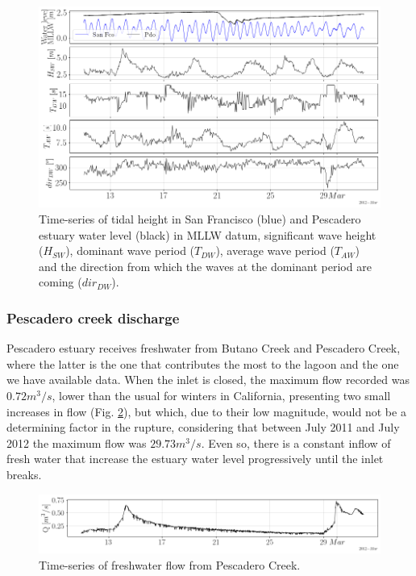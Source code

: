 \documentclass[tesis.tex]{subfiles}
\begin{document}
\begin{figure}[h!]
    \centering
    \includegraphics[width=\textwidth]{Imagenes/wave1.png}
    \caption{Time-series of tidal height in San Francisco (blue) and Pescadero estuary water level (black) in MLLW datum, significant wave height ($H_{SW}$), dominant wave period ($T_{DW}$), average wave period ($T_{AW}$) and the direction from which the waves at the dominant period are coming ($dir_{DW}$).}
    \label{fig:wave1}
\end{figure}

\subsubsection{Pescadero creek discharge}

Pescadero estuary receives freshwater from Butano Creek and Pescadero Creek, where the latter is the one that contributes the most to the lagoon and the one we have available data. When the inlet is closed, the maximum flow recorded was $0.72 m^3/s$, lower than the usual for winters in California, presenting two small increases in flow (Fig. \ref{fig:q}), but which, due to their low magnitude, would not be a determining factor in the rupture, considering that between July 2011 and July 2012 the maximum flow was $29.73 m^3/s$. Even so, there is a constant inflow of fresh water that increase the estuary water level progressively until the inlet breaks.  

\begin{figure}[h!]
    \centering
    \includegraphics[width=\textwidth]{Imagenes/Q.png}
    \caption{Time-series of freshwater flow from Pescadero Creek.}
    \label{fig:q}
\end{figure}
\end{document}
